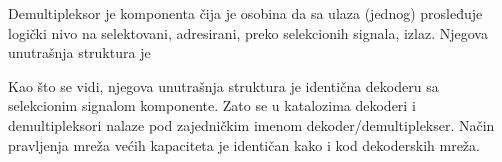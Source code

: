 \begin{frame}[label=03-s012]
\gusttekst
Demultipleksor je komponenta čija je osobina da sa ulaza (jednog) prosleđuje logički nivo na selektovani, adresirani, preko selekcionih signala, izlaz. Njegova unutrašnja struktura je
\par\centering
\par
\raggedright
Kao što se vidi, njegova unutrašnja struktura je identična dekoderu sa selekcionim signalom komponente. Zato se u katalozima dekoderi i demultipleksori nalaze pod zajedničkim imenom dekoder/demultiplekser. Način pravljenja mreža većih kapaciteta je identičan kako i kod dekoderskih mreža.
\end{frame}
